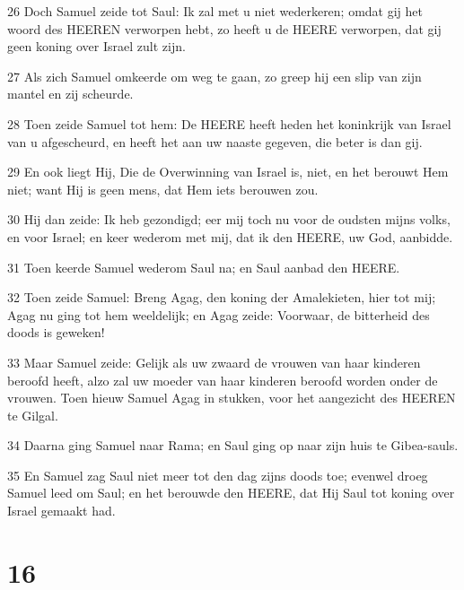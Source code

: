 \par 26 Doch Samuel zeide tot Saul: Ik zal met u niet wederkeren; omdat gij het woord des HEEREN verworpen hebt, zo heeft u de HEERE verworpen, dat gij geen koning over Israel zult zijn.
\par 27 Als zich Samuel omkeerde om weg te gaan, zo greep hij een slip van zijn mantel en zij scheurde.
\par 28 Toen zeide Samuel tot hem: De HEERE heeft heden het koninkrijk van Israel van u afgescheurd, en heeft het aan uw naaste gegeven, die beter is dan gij.
\par 29 En ook liegt Hij, Die de Overwinning van Israel is, niet, en het berouwt Hem niet; want Hij is geen mens, dat Hem iets berouwen zou.
\par 30 Hij dan zeide: Ik heb gezondigd; eer mij toch nu voor de oudsten mijns volks, en voor Israel; en keer wederom met mij, dat ik den HEERE, uw God, aanbidde.
\par 31 Toen keerde Samuel wederom Saul na; en Saul aanbad den HEERE.
\par 32 Toen zeide Samuel: Breng Agag, den koning der Amalekieten, hier tot mij; Agag nu ging tot hem weeldelijk; en Agag zeide: Voorwaar, de bitterheid des doods is geweken!
\par 33 Maar Samuel zeide: Gelijk als uw zwaard de vrouwen van haar kinderen beroofd heeft, alzo zal uw moeder van haar kinderen beroofd worden onder de vrouwen. Toen hieuw Samuel Agag in stukken, voor het aangezicht des HEEREN te Gilgal.
\par 34 Daarna ging Samuel naar Rama; en Saul ging op naar zijn huis te Gibea-sauls.
\par 35 En Samuel zag Saul niet meer tot den dag zijns doods toe; evenwel droeg Samuel leed om Saul; en het berouwde den HEERE, dat Hij Saul tot koning over Israel gemaakt had.

\chapter{16}


